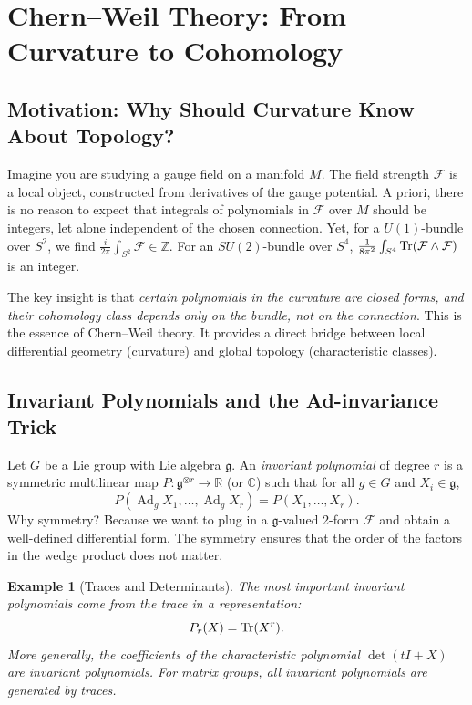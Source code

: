 \documentclass[11pt]{article}
\newcommand{\Ad}{\operatorname{Ad}}    %
\newcommand{\cF}{\mathcal{F}}
\newcommand{\g}{\mathfrak{g}}
\newcommand{\C}{\mathbb{C}}
\newcommand{\R}{\mathbb{R}}
\newcommand{\Z}{\mathbb{Z}}
\newtheorem{example}[theorem]{Example}
\begin{document}
\section{Chern--Weil Theory: From Curvature to Cohomology}
\label{sec:chern-weil}

\subsection{Motivation: Why Should Curvature Know About Topology?}
Imagine you are studying a gauge field on a manifold \(M\). The field strength \(\cF\) is a local object, constructed from derivatives of the gauge potential. A priori, there is no reason to expect that integrals of polynomials in \(\cF\) over \(M\) should be integers, let alone independent of the chosen connection. Yet, for a \(U(1)\)-bundle over \(S^2\), we find \(\frac{i}{2\pi}\int_{S^2}\cF \in \Z\). For an \(SU(2)\)-bundle over \(S^4\), \(\frac{1}{8\pi^2}\int_{S^4}\Tr(\cF\wedge\cF)\) is an integer. 

The key insight is that \emph{certain polynomials in the curvature are closed forms, and their cohomology class depends only on the bundle, not on the connection}. This is the essence of Chern--Weil theory. It provides a direct bridge between local differential geometry (curvature) and global topology (characteristic classes).

\subsection{Invariant Polynomials and the Ad-invariance Trick}
Let \(G\) be a Lie group with Lie algebra \(\g\). An \emph{invariant polynomial} of degree \(r\) is a symmetric multilinear map \(P: \g^{\otimes r} \to \R\) (or \(\C\)) such that for all \(g\in G\) and \(X_i\in\g\),
\[
P(\Ad_g X_1,\dots,\Ad_g X_r) = P(X_1,\dots,X_r).
\]
Why symmetry? Because we want to plug in a \(\g\)-valued 2-form \(\cF\) and obtain a well-defined differential form. The symmetry ensures that the order of the factors in the wedge product does not matter.

\begin{example}[Traces and Determinants]
The most important invariant polynomials come from the trace in a representation:
\[
P_r(X) = \Tr(X^r).
\]
More generally, the coefficients of the characteristic polynomial \(\det(tI + X)\) are invariant polynomials. For matrix groups, all invariant polynomials are generated by traces.
\end{example}
\end{document}
